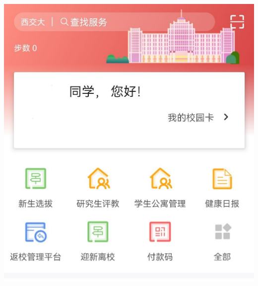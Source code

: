 \documentclass[
decoration,  %
]{qyxf-book}
\begin{document}
\begin{minipage}[b]{0.4\linewidth}
	\includegraphics[width=8\baselineskip]{pics/app01.png}

\end{minipage}
\end{document}
